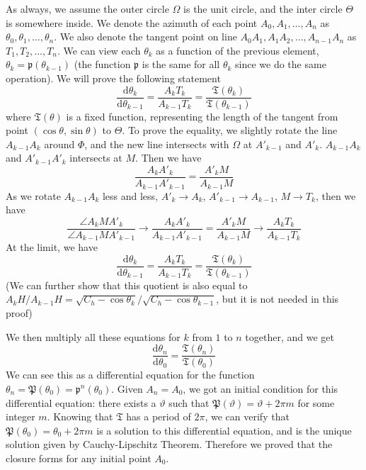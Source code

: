 \documentclass[]{article}
\newcommand{\ud}{\mathrm{d}}
\begin{document}
As always, we assume the outer circle $\Omega$ is the unit circle, and the inter circle $\Theta$ is somewhere inside. We denote the azimuth of each point $A_0, A_1,\dots,A_n$ as $\theta_0,\theta_1,\dots,\theta_n$. We also denote the tangent point on line $A_0A_1, A_1A_2,\dots,A_{n-1}A_n$ as $T_1, T_2,\dots, T_n$. We can view each $\theta_k$ as a function of the previous element, $\theta_k=\mathfrak{p}(\theta_{k-1})$ (the function $\mathfrak{p}$ is the same for all $\theta_k$ since we do the same operation). We will prove the following statement
\[
\frac{\ud \theta_{k}}{\ud \theta_{k-1}} = \frac{A_kT_k}{A_{k-1}T_{k}} = \frac{\mathfrak{T}(\theta_{k})}{\mathfrak{T}(\theta_{k-1})}
\]
where $\mathfrak{T}(\theta)$ is a fixed function, representing the length of the tangent from point $(\cos\theta, \sin\theta)$ to $\Theta$. To prove the equality, we slightly rotate the line $A_{k-1} A_k$ around $\Phi$, and the new line intersects with $\Omega$ at $A'_{k-1}$ and $A'_k$. $A_{k-1} A_k$ and $A'_{k-1} A'_k$ intersects at $M$. Then we have
\[
\frac{A_k A'_k}{A_{k-1}A'_{k-1}} = \frac{A'_{k}M}{A_{k-1}M}
\]
As we rotate $A_{k-1} A_k$ less and less, $A'_k \to A_k$, $A'_{k-1} \to A_{k-1}$, $M\to T_k$, then we have
\[
\frac{\angle A_k M  A'_k}{\angle A_{k-1} M A'_{k-1}} \to \frac{A_k A'_k}{A_{k-1}A'_{k-1}} = \frac{A'_{k}M}{A_{k-1}M} \to \frac{A_{k}T_k}{A_{k-1}T_k}
\]
At the limit, we have
\[
\frac{\ud \theta_{k}}{\ud \theta_{k-1}} = \frac{A_kT_k}{A_{k-1}T_{k}} =  \frac{\mathfrak{T}(\theta_{k})}{\mathfrak{T}(\theta_{k-1})}
\]
(We can further show that this quotient is also equal to $A_kH/A_{k-1}H = \sqrt{C_h-\cos\theta_k}/\sqrt{C_h-\cos\theta_{k-1}}$, but it is not needed in this proof)

We then multiply all these equations for $k$ from $1$ to $n$ together, and we get
\[
\frac{\ud \theta_{n}}{\ud \theta_{0}}  = \frac{\mathfrak{T}(\theta_{n})}{\mathfrak{T}(\theta_{0})}
\]
We can see this as a differential equation for the function $\theta_n = \mathfrak{P}(\theta_0) =\mathfrak{p}^n(\theta_0)$. Given $A_n = A_0$, we got an initial condition for this differential equation: there exists a $\vartheta$ such that $\mathfrak{P}(\vartheta) = \vartheta + 2\pi m$ for some integer $m$. Knowing that $\mathfrak{T}$ has a period of $2\pi$, we can verify that $\mathfrak{P}(\theta_0) = \theta_0 + 2\pi m$ is a solution to this differential equation, and is the unique solution given by Cauchy-Lipschitz Theorem. Therefore we proved that the closure forms for any initial point $A_0$.
 
\end{document}
